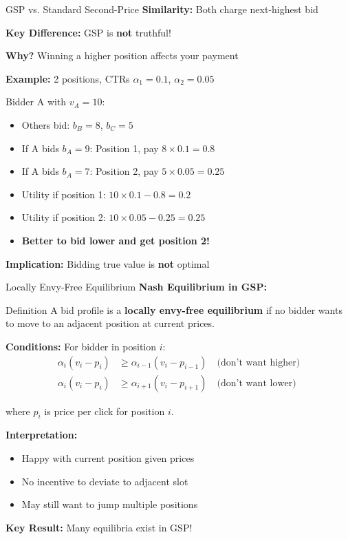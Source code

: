 \documentclass[xcolor={x11names}, aspectratio=169 ]{beamer}
\begin{document}
\begin{frame}{GSP vs. Standard Second-Price}
\textbf{Similarity:} Both charge next-highest bid

\textbf{Key Difference:} GSP is \textbf{not} truthful!

\textbf{Why?} Winning a higher position affects your payment

\textbf{Example:} 2 positions, CTRs $\alpha_1 = 0.1$, $\alpha_2 = 0.05$

Bidder A with $v_A = 10$:
\begin{itemize}
  \item Others bid: $b_B = 8$, $b_C = 5$
  \item If A bids $b_A = 9$: Position 1, pay $8 \times 0.1 = 0.8$
  \item If A bids $b_A = 7$: Position 2, pay $5 \times 0.05 = 0.25$
  \item Utility if position 1: $10 \times 0.1 - 0.8 = 0.2$
  \item Utility if position 2: $10 \times 0.05 - 0.25 = 0.25$
  \item \textbf{Better to bid lower and get position 2!}
\end{itemize}

\textbf{Implication:} Bidding true value is \textbf{not} optimal
\end{frame}

\begin{frame}{Locally Envy-Free Equilibrium}
\textbf{Nash Equilibrium in GSP:}

\begin{block}{Definition}
A bid profile is a \textbf{locally envy-free equilibrium} if no bidder wants to move to an adjacent position at current prices.
\end{block}

\textbf{Conditions:} For bidder in position $i$:
\begin{align*}
\alpha_i(v_i - p_i) &\geq \alpha_{i-1}(v_i - p_{i-1}) \quad \text{(don't want higher)} \\
\alpha_i(v_i - p_i) &\geq \alpha_{i+1}(v_i - p_{i+1}) \quad \text{(don't want lower)}
\end{align*}

where $p_i$ is price per click for position $i$.

\textbf{Interpretation:}
\begin{itemize}
  \item Happy with current position given prices
  \item No incentive to deviate to adjacent slot
  \item May still want to jump multiple positions
\end{itemize}

\textbf{Key Result:} Many equilibria exist in GSP!
\end{frame}
\end{document}
